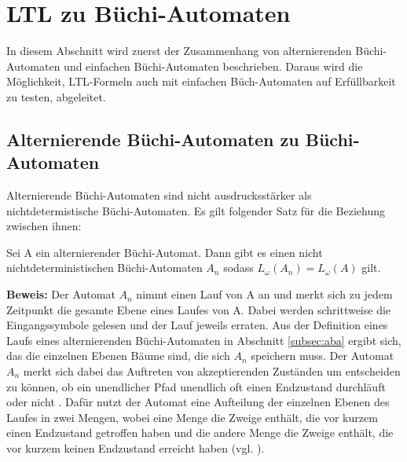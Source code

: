 \section{LTL zu Büchi-Automaten}

In diesem Abschnitt wird zuerst der Zusammenhang von alternierenden Büchi-Automaten und einfachen Büchi-Automaten beschrieben. Daraus wird die Möglichkeit, LTL-Formeln auch mit einfachen Büch-Automaten auf Erfüllbarkeit zu testen, abgeleitet.

\subsection{Alternierende Büchi-Automaten zu Büchi-Automaten}

Alternierende Büchi-Automaten sind nicht ausdrucksstärker als nichtdetermistische Büchi-Automaten. Es gilt folgender Satz für die Beziehung zwischen ihnen:
\begin{satz}\cite{vardi+96,miyano+84}
\label{ABA>BA}
Sei A ein alternierender Büchi-Automat. Dann gibt es einen nicht nichtdeterministischen Büchi-Automaten $A_n$ sodass $L_{\omega}(A_n)=L_{\omega}(A)$ gilt.
\end{satz}
\textbf{Beweis:} Der Automat $A_n$ nimmt einen Lauf von A an und merkt sich zu jedem Zeitpunkt die gesamte Ebene eines Laufes von A. Dabei werden schrittweise die Eingangssymbole gelesen und der Lauf jeweils erraten. Aus der Definition eines Laufs eines alternierenden Büchi-Automaten in Abschnitt \ref{subsec:aba} ergibt sich, das die einzelnen Ebenen Bäume sind, die sich $A_n$ speichern muss. Der Automat $A_n$ merkt sich dabei das Auftreten von akzeptierenden Zuständen um entscheiden zu können, ob ein unendlicher Pfad unendlich oft einen Endzustand durchläuft oder nicht \cite{vardi+96}. Dafür nutzt der Automat eine Aufteilung der einzelnen Ebenen des Laufes in zwei Mengen, wobei eine Menge die Zweige enthält, die vor kurzem einen Endzustand getroffen haben und die andere Menge die Zweige enthält, die vor kurzem keinen Endzustand erreicht haben (vgl. \cite{vardi+96}).


